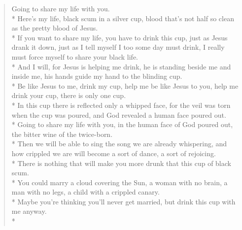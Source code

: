 \documentclass[english,11pt,letterpaper,onecolumn]{scrbook}
\begin{document}
\begin{verse}
Going to share my life with you. \\*
Here's my life, black scum in a silver cup, blood that's not half so clean as the pretty blood of Jesus. \\*
If you want to share my life, you have to drink this cup, just as Jesus drank it down, just as I tell myself I too some day must drink, I really must force myself to share your black life. \\*
And I will, for Jesus is helping me drink, he is standing beside me and inside me, his hands guide my hand to the blinding cup. \\*
Be like Jesus to me, drink my cup, help me be like Jesus to you, help me drink your cup, there is only one cup. \\*
In this cup there is reflected only a whipped face, for the veil was torn when the cup was poured, and God revealed a human face poured out. \\*
Going to share my life with you, in the human face of God poured out, the bitter wine of the twice-born. \\*
Then we will be able to sing the song we are already whispering, and how crippled we are will become a sort of dance, a sort of rejoicing. \\*
There is nothing that will make you more drunk that this cup of black scum. \\*
You could marry a cloud covering the Sun, a woman with no brain, a man with no legs, a child with a crippled canary. \\*
Maybe you're thinking you'll never get married, but drink this cup with me anyway.\\*
\end{verse}


\newpage
{}
\end{document}
